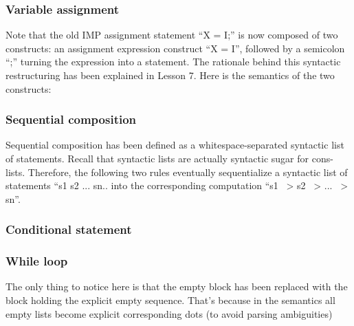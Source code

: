 \documentclass{article}
\begin{document}
\begin{kdefinition}
\begin{module}{}
\begin{kblock}[text]
 \subsubsection{Variable assignment}
Note that the old IMP assignment statement ``X = I;'' is now composed of two
constructs: an assignment expression construct ``X = I'', followed by a
semicolon ``;'' turning the expression into a statement.  The rationale behind
this syntactic restructuring has been explained in Lesson 7.  Here is the
semantics of the two constructs: \end{kblock}
\begin{kblock}[text]
 \subsubsection{Sequential composition}
Sequential composition has been defined as a whitespace-separated syntactic
list of statements.  Recall that syntactic lists are actually syntactic
sugar for cons-lists.  Therefore, the following two rules eventually
sequentialize a syntactic list of statements ``s1 s2 ... sn.. into the
corresponding computation ``s1 ~> s2 ~> ... ~> sn''. \end{kblock}
\begin{kblock}[text]
 \subsubsection{Conditional statement}\end{kblock}
\begin{kblock}[text]
 \subsubsection{While loop}
The only thing to notice here is that the empty block has been replaced
with the block holding the explicit empty sequence.  That's because in
the semantics all empty lists become explicit corresponding dots
(to avoid parsing ambiguities) \end{kblock}
\begin{kblock}[text]

\end{kblock}
\end{module}
\end{kdefinition}
\end{document}

